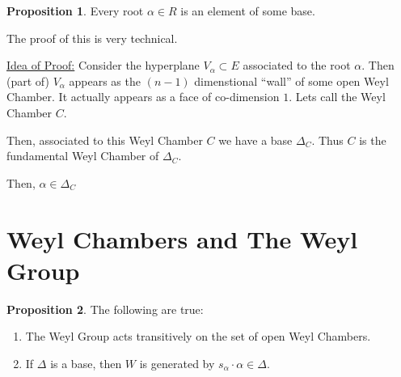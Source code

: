 \documentclass{article}
\theoremstyle{definition}
\newtheorem{proposition}{Proposition}
\begin{document}
\begin{proposition}
    Every root \(\alpha \in R\) is an element of some base. 
\end{proposition}

The proof of this is very technical.

\underline{Idea of Proof:} Consider the hyperplane \(V_\alpha \subset E\) associated to the root \(\alpha\). Then (part of) \(V_\alpha\) appears as the \((n-1)\) dimenstional ``wall'' of some open Weyl Chamber. It actually appears as a face of co-dimension \(1\). Lets call the Weyl Chamber \(C\).

Then, associated to this Weyl Chamber \(C\) we have a base \(\Delta_C\). Thus \(C\) is the fundamental Weyl Chamber of \(\Delta_C\).

Then, \(\alpha \in \Delta_C\) 

\section*{Weyl Chambers and The Weyl Group}

\begin{proposition}
    The following are true:

    \begin{enumerate}
        \item The Weyl Group acts transitively on the set of open Weyl Chambers.
        \item If \(\Delta\) is a base, then \(W\) is generated by \(s_\alpha\cdot\alpha \in \Delta\).
    \end{enumerate}
\end{proposition}
\end{document}
